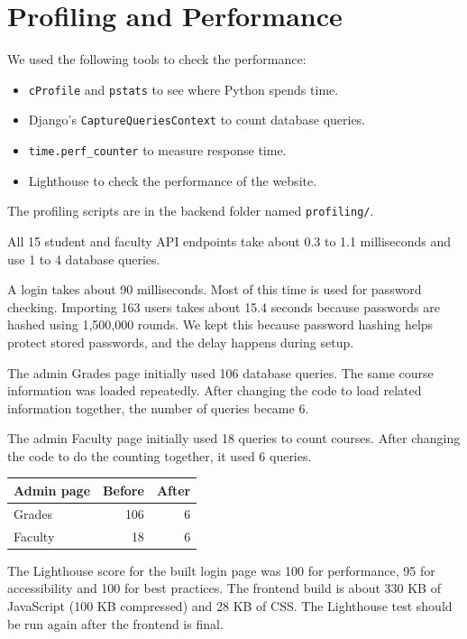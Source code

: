 \documentclass[11pt,a4paper]{article}
\begin{document}
\section{Profiling and Performance}

We used the following tools to check the performance:
\begin{itemize}
    \item \texttt{cProfile} and \texttt{pstats} to see where Python spends time.
    \item Django's \texttt{CaptureQueriesContext} to count database queries.
    \item \texttt{time.perf\_counter} to measure response time.
    \item Lighthouse to check the performance of the website.
\end{itemize}

The profiling scripts are in the backend folder named \texttt{profiling/}.

All 15 student and faculty API endpoints take about 0.3 to 1.1 milliseconds
and use 1 to 4 database queries.

A login takes about 90 milliseconds. Most of this time is used for password
checking. Importing 163 users takes about 15.4 seconds because passwords are
hashed using 1,500,000 rounds. We kept this because password hashing helps
protect stored passwords, and the delay happens during setup.

The admin Grades page initially used 106 database queries. The same course
information was loaded repeatedly. After changing the code to load related
information together, the number of queries became 6.

The admin Faculty page initially used 18 queries to count courses. After
changing the code to do the counting together, it used 6 queries.

\begin{table}[H]
\centering
\begin{tabular}{lrr}
\toprule
\textbf{Admin page} & \textbf{Before} & \textbf{After} \\
\midrule
Grades & 106 & 6 \\
Faculty & 18 & 6 \\
\bottomrule
\end{tabular}
\end{table}

The Lighthouse score for the built login page was 100 for performance, 95 for
accessibility and 100 for best practices. The frontend build is about 330 KB
of JavaScript (100 KB compressed) and 28 KB of CSS. The Lighthouse test should
be run again after the frontend is final.
\end{document}
